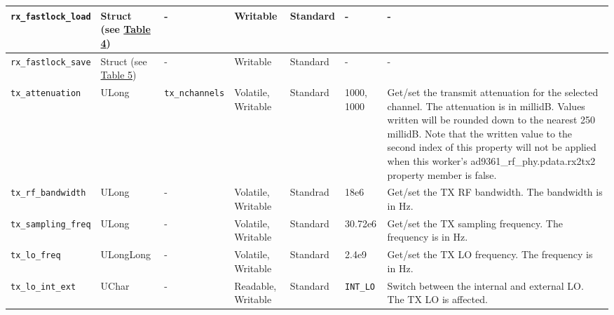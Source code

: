 \documentclass{article}
\begin{document}
\begin{landscape}
\begin{scriptsize}
\begin{longtable}{|p{3.6cm}|p{8.1cm}|p{1.4cm}|p{1.3cm}|p{1.4cm}|p{2.5cm}|p{3.6cm}|}
			\hline
			\verb+rx_fastlock_load+ & Struct (see \hyperlink{tab4}{Table 4}) & - & Writable & Standard & - & - \\
			\hline
			\verb+rx_fastlock_save+ & Struct (see \hyperlink{tab5}{Table 5}) & - & Writable & Standard & - & - \\
			\hline
			\verb+tx_attenuation+ & ULong & \verb+tx_nchannels+ & Volatile, Writable & Standard & 1000, 1000 & Get/set the transmit attenuation for the selected channel. The attenuation is in millidB. Values written will be rounded down to the nearest 250 millidB. Note that the written value to the second index of this property will not be applied when this worker's ad9361\_rf\_phy.pdata.rx2tx2 property member is false. \\
			\hline
			\verb+tx_rf_bandwidth+ & ULong & - & Volatile, Writable & Standrad & 18e6 & Get/set the TX RF bandwidth. The bandwidth is in Hz. \\
			\hline
			\verb+tx_sampling_freq+ & ULong & - & Volatile, Writable & Standard & 30.72e6 & Get/set the TX sampling frequency. The frequency is in Hz. \\
			\hline
			\verb+tx_lo_freq+ & ULongLong & - & Volatile, Writable & Standard & 2.4e9 & Get/set the TX LO frequency. The frequency is in Hz. \\
			\hline
			\verb+tx_lo_int_ext+ & UChar & - & Readable, Writable & Standard & \verb+INT_LO+ & Switch between the internal and external LO. The TX LO is affected. \\
			\hline

\end{longtable}
\end{scriptsize}
\end{landscape}
\end{document}
